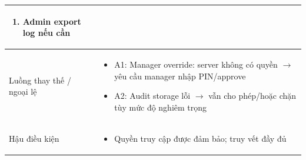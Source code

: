 \begin{longtable}{|>{\raggedright\arraybackslash}p{}|>{\raggedright\arraybackslash}p{}|}
\begin{enumerate}[leftmargin=*]
\item Admin export log nếu cần
\end{enumerate}
\vspace{-0.5em}
\\
\hline
Luồng thay thế / ngoại lệ &
\vspace{-0.5em}
\begin{itemize}[leftmargin=*]
\item A1: Manager override: server không có quyền $\rightarrow$ yêu cầu manager nhập PIN/approve
\item A2: Audit storage lỗi $\rightarrow$ vẫn cho phép/hoặc chặn tùy mức độ nghiêm trọng
\end{itemize}
\vspace{-0.5em}
\\
\hline
Hậu điều kiện &
\vspace{-0.5em}
\begin{itemize}[leftmargin=*]
\item Quyền truy cập được đảm bảo; truy vết đầy đủ
\end{itemize}
\vspace{-0.5em}
\\
\hline
\end{longtable}